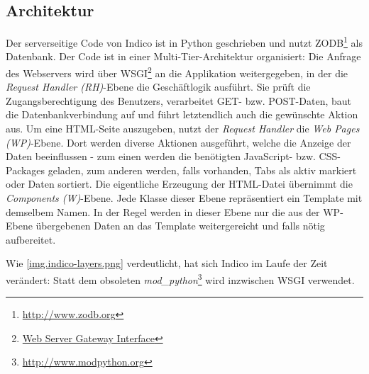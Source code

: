 \subsection{Architektur}
Der serverseitige Code von Indico ist in Python geschrieben und nutzt
ZODB\footnote{\href{http://www.zodb.org}{http://www.zodb.org}} als Datenbank. Der Code ist in einer
Multi-Tier-Architektur organisiert: Die Anfrage des Webservers wird über
WSGI\footnote{\href{http://www.python.org/dev/peps/pep-0333/}{Web Server Gateway Interface}} an die
Applikation weitergegeben, in der die \emph{Request Handler (RH)}-Ebene die Geschäftlogik ausführt.
Sie prüft die Zugangsberechtigung des Benutzers, verarbeitet GET- bzw. POST-Daten, baut die
Datenbankverbindung auf und führt letztendlich auch die gewünschte Aktion aus. Um eine HTML-Seite
auszugeben, nutzt der \emph{Request Handler} die \emph{Web Pages (WP)}-Ebene. Dort werden diverse
Aktionen ausgeführt, welche die Anzeige der Daten beeinflussen - zum einen werden die benötigten
JavaScript- bzw. CSS-Packages geladen, zum anderen werden, falls vorhanden, Tabs als aktiv markiert
oder Daten sortiert. Die eigentliche Erzeugung der HTML-Datei übernimmt die \emph{Components
(W)}-Ebene. Jede Klasse dieser Ebene repräsentiert ein Template mit demselbem Namen. In der Regel
werden in dieser Ebene nur die aus der WP-Ebene übergebenen Daten an das Template weitergereicht und
falls nötig aufbereitet.

\newpage
Wie \autoref{img.indico-layers.png} verdeutlicht, hat sich Indico im Laufe der Zeit verändert: Statt
dem obsoleten \emph{mod\_python}\footnote{\href{http://www.modpython.org}{http://www.modpython.org}}
wird inzwischen WSGI verwendet.

